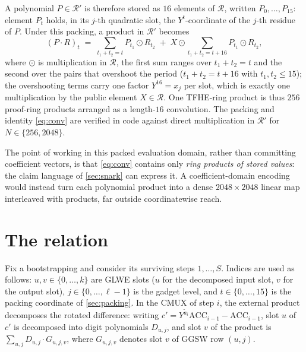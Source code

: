 \documentclass[11pt]{article}
\newcommand{\ring}{\mathcal{R}}
\newcommand{\tring}{\mathcal{R}'}
\newcommand{\ACC}{\mathrm{ACC}}
\begin{document}
A polynomial $P \in \tring$ is therefore stored as $16$ elements of $\ring$, written $P_0, \dots, P_{15}$: element $P_t$ holds, in its $j$-th quadratic slot, the $Y^t$-coordinate of the $j$-th residue of $P$. Under this packing, a product in $\tring$ becomes
\begin{equation}\label{eq:conv}
  (P \cdot R)_t \;=\; \sum_{t_1 + t_2 = t} P_{t_1} \odot R_{t_2} \;+\; X \odot \sum_{t_1 + t_2 = t + 16} P_{t_1} \odot R_{t_2},
\end{equation}
where $\odot$ is multiplication in $\ring$, the first sum ranges over $t_1 + t_2 = t$ and the second over the pairs that overshoot the period ($t_1 + t_2 = t + 16$ with $t_1, t_2 \le 15$); the overshooting terms carry one factor $Y^{16} = x_j$ per slot, which is exactly one multiplication by the public element $X \in \ring$. One TFHE-ring product is thus $256$ proof-ring products arranged as a length-$16$ convolution. The packing and identity \eqref{eq:conv} are verified in code against direct multiplication in $\tring$ for $N \in \{256, 2048\}$.

The point of working in this packed evaluation domain, rather than committing coefficient vectors, is that \eqref{eq:conv} contains only \emph{ring products of stored values}: the claim language of \cref{sec:snark} can express it. A coefficient-domain encoding would instead turn each polynomial product into a dense $2048 \times 2048$ linear map interleaved with products, far outside coordinatewise reach.

\section{The relation}\label{sec:relation}

Fix a bootstrapping and consider its surviving steps $1, \dots, S$. Indices are used as follows: $u, v \in \{0, \dots, k\}$ are GLWE slots ($u$ for the decomposed input slot, $v$ for the output slot), $j \in \{0, \dots, \ell - 1\}$ is the gadget level, and $t \in \{0, \dots, 15\}$ is the packing coordinate of \cref{sec:packing}. In the CMUX of step $i$, the external product decomposes the rotated difference: writing $c' = Y^{\tilde a_i} \ACC_{i-1} - \ACC_{i-1}$, slot $u$ of $c'$ is decomposed into digit polynomials $D_{u,j}$, and slot $v$ of the product is $\sum_{u,j} D_{u,j} \cdot G_{u,j,v}$, where $G_{u,j,v}$ denotes slot $v$ of GGSW row $(u, j)$.
\end{document}
